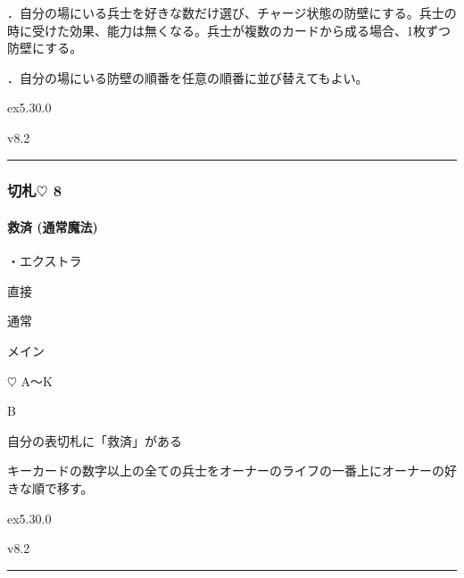 \documentclass[letterpaper,10pt,dvipdfmx]{sphinxmanual}
\begin{document}
\sphinxAtStartPar
{}

．自分の場にいる兵士を好きな数だけ選び、チャージ状態の防壁にする。兵士の時に受けた効果、能力は無くなる。兵士が複数のカードから成る場合、1枚ずつ防壁にする。

．自分の場にいる防壁の順番を任意の順番に並び替えてもよい。

\sphinxAtStartPar
{}  ex5.30.0

\sphinxAtStartPar
{}  v8.2


\bigskip\hrule\bigskip



\subsubsection{切札{\normalsize $\heartsuit$} 8}
\label{\detokenize{auto/frameActionlist:id42}}

\paragraph{救済 (通常魔法)}
\label{\detokenize{auto/frameActionlist:act-salvation}}\label{\detokenize{auto/frameActionlist:id43}}
\sphinxAtStartPar
{}

\sphinxAtStartPar
・エクストラ

\sphinxAtStartPar
{} 直接

\sphinxAtStartPar
{} 通常

\sphinxAtStartPar
{} メイン

\sphinxAtStartPar
{} {\normalsize $\heartsuit$} A〜K

\sphinxAtStartPar
{} B

\sphinxAtStartPar
{}

\sphinxAtStartPar
自分の表切札に「救済」がある

\sphinxAtStartPar
{}

\sphinxAtStartPar
キーカードの数字以上の全ての兵士をオーナーのライフの一番上にオーナーの好きな順で移す。

\sphinxAtStartPar
{}  ex5.30.0

\sphinxAtStartPar
{}  v8.2


\bigskip\hrule\bigskip
\end{document}
